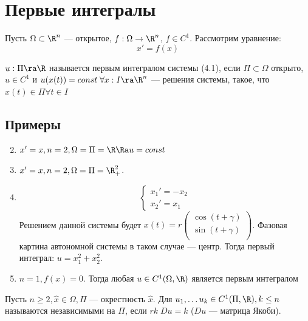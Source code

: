 
\section{Первые интегралы}

Пусть \(\Omega \subset \R^n\) --- открытое, \(f: \Omega \to \R^n\), \(f \in C^1\). Рассмотрим уравнение:
\begin{equation}
    x' = f(x)
\end{equation}

\begin{definition}
    \(u: \Pi \ra \R\) называется первым интегралом системы (4.1), если \(\Pi \subset \Omega\) открыто, \(u \in C^1\) и \(u(x(t)) = const\;\forall x: I \ra \R^n\) --- решения системы, такое, что \(x(t) \in \Pi \forall t \in I\)
\end{definition}

\subsection{Примеры}
\begin{enumerate}
    \setcounter{enumi}{1}
    \item \(x' = x, n = 2, \Omega = \Pi = \R \Ra u = const\)
    \item \(x' = x, n = 2, \Omega = \Pi = \R_+^2\).
    \item \[\left\{\begin{array}{l}
        x_1' = -x_2 \\
        x_2' = x_1
    \end{array}\right.\]
    Решением данной системы будет \(x(t) = r\left( \begin{array}{c}
        \cos(t + \gamma) \\
        \sin(t + \gamma) \\
    \end{array} \right)\). Фазовая картина автономной системы в таком случае --- центр. Тогда первый интеграл: \(u = x_1^2 + x_2^2\).
    \item \(n = 1, f(x) = 0\). Тогда любая \(u \in C^1(\Omega, \R)\) является первым интегралом
\end{enumerate}

\begin{definition}
    Пусть \(n \ge 2, \hat{x} \in \Omega, \Pi\) --- окрестность \( \hat{x}\). Для \(u_1, \dots u_k \in C^1(\Pi, \R), k \le n\) называются независимыми на \(\Pi\), если \(rk\;Du = k\) (\(Du\) --- матрица Якоби).
\end{definition}


